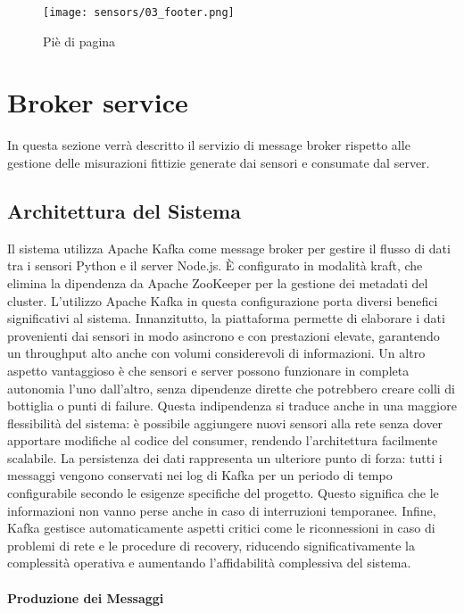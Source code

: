 \begin{figure}[H]
  \centering
  \texttt{[image: sensors/03\_footer.png]}
  \caption{Piè di pagina}
  \label{fig:sensors-footer}
\end{figure}

\section{Broker service}

In questa sezione verrà descritto il servizio di message broker rispetto alle gestione delle misurazioni fittizie
generate dai sensori e consumate dal server.

\subsection{Architettura del Sistema}

Il sistema utilizza Apache Kafka come message broker per gestire il flusso di dati
tra i sensori Python e il server Node.js. È configurato in modalità \acrfull{kraft}, che elimina la dipendenza
da Apache ZooKeeper per la gestione dei metadati del cluster.
L'utilizzo Apache Kafka in questa configurazione porta diversi benefici significativi al sistema.
Innanzitutto, la piattaforma permette di elaborare i dati provenienti dai sensori in modo asincrono e con prestazioni
elevate, garantendo un throughput alto anche con volumi considerevoli di informazioni.
Un altro aspetto vantaggioso è che sensori e server possono funzionare in completa autonomia l'uno dall'altro,
senza dipendenze dirette che potrebbero creare colli di bottiglia o punti di failure.
Questa indipendenza si traduce anche in una maggiore flessibilità del sistema: è possibile aggiungere nuovi sensori
alla rete senza dover apportare modifiche al codice del consumer, rendendo l'architettura facilmente scalabile.
La persistenza dei dati rappresenta un ulteriore punto di forza: tutti i messaggi vengono conservati nei log di Kafka
per un periodo di tempo configurabile secondo le esigenze specifiche del progetto.
Questo significa che le informazioni non vanno perse anche in caso di interruzioni temporanee.
Infine, Kafka gestisce automaticamente aspetti critici come le riconnessioni in caso di problemi di rete e le procedure
di recovery, riducendo significativamente la complessità operativa e aumentando l'affidabilità complessiva del sistema.

\paragraph{Produzione dei Messaggi}

